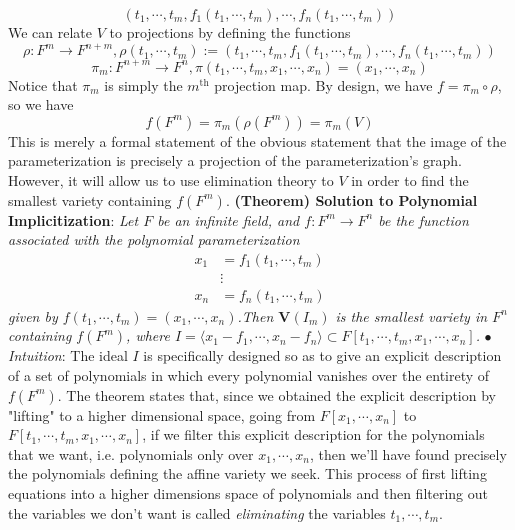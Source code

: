 \documentclass{article}
\begin{document}
$$ (t_1, \cdots, t_m, f_1(t_1, \cdots, t_m), \cdots, f_n(t_1, \cdots, t_m)) $$
We can relate $ V $ to projections by defining the functions
$$ \rho: F^m \rightarrow F^{n + m}, \rho(t_1, \cdots, t_m) := (t_1, \cdots, t_m, f_1(t_1, \cdots, t_m), \cdots, f_n(t_1, \cdots, t_m)) $$
$$ \pi_m: F^{n + m} \rightarrow F^n, \pi(t_1, \cdots, t_m, x_1, \cdots, x_n) = (x_1, \cdots, x_n) $$
Notice that $ \pi_m $ is simply the $ m^{\text{th}} $ projection map. By design, we have $ f = \pi_m \circ \rho $, so we have
$$ f(F^m) = \pi_m(\rho(F^m)) = \pi_m(V) $$
This is merely a formal statement of the obvious statement that the image of the parameterization is precisely a projection of the parameterization's graph. However, it will allow us to use elimination theory to $ V $ in order to find the smallest variety containing $ f(F^m) $.
\newline \newline
\textbf{(Theorem) Solution to Polynomial Implicitization}: \textit{Let $ F $ be an infinite field, and $ f: F^m \rightarrow F^n $ be the function associated with the polynomial parameterization}
$$ \begin{aligned}
	x_1 &= f_1(t_1, \cdots, t_m) \\
	& \vdots \\
	x_n &= f_n(t_1, \cdots, t_m)
\end{aligned} $$
\indent \textit{given by $ f(t_1, \cdots, t_m) = (x_1, \cdots, x_n) $.Then $ \mathbf{V}(I_m) $ is the smallest variety in $ F^n $ containing $ f(F^m) $, where $ I = \langle x_1 - f_1, \cdots, x_n - f_n \rangle \subset F[t_1, \cdots, t_m, x_1, \cdots, x_n] $.}
\newline
\indent $ \bullet $ \textit{Intuition}: The ideal $ I $ is specifically designed so as to give an explicit description of a set of polynomials in which every polynomial vanishes over the entirety of $ f(F^m) $. The theorem states that, since we obtained the explicit description by "lifting" to a higher dimensional space, going from $ F[x_1, \cdots, x_n] $ to $ F[t_1, \cdots, t_m, x_1, \cdots, x_n] $, if we filter this explicit description for the polynomials that we want, i.e. polynomials only over $ x_1, \cdots, x_n $, then we'll have found precisely the polynomials defining the affine variety we seek. This process of first lifting equations into a higher dimensions space of polynomials and then filtering out the variables we don't want is called \textit{eliminating} the variables $ t_1, \cdots, t_m $.
\newline
\end{document}
